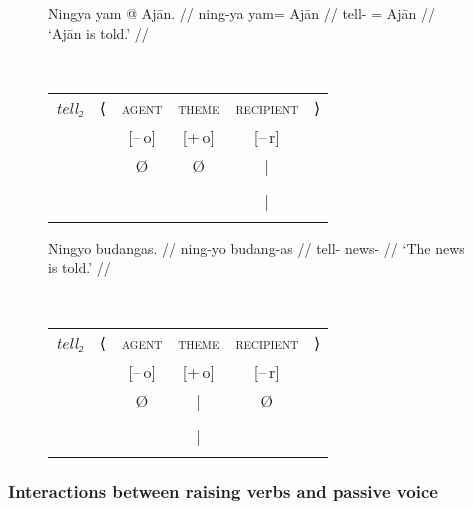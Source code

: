 \begin{figure}
\pex\label{ex:intrnzn_pass}
\a\label{ex:intrnzn_pass_1}%
\ljudge*\begin{minipage}[t]{.4\remaining}
\begingl
	\gla Ningya yam @ Ajān. //
	\glb ning-ya yam= Ajān //
	\glc tell-\TsgF{} \Dat{}= Ajān //
	\glft `Ajān is told.' //
\endgl
\end{minipage}
~
\begin{tabular}[t]{>{\itshape}l l c c c r}
tell₂
	& ⟨
	& \textsc{agent}
	& \textsc{theme}
	& \textsc{recipient}
	& ⟩
	\\
%
	& %
	& [–\,o]
	& [+\,o]
	& [–\,r]
	& %
	\\

%
	& %
	& Ø
	& Ø
	& |
	& %
	\\

%
	& %
	& %
	& %
	& \Subj
	& %
	\\

%
	& %
	& %
	& %
	& |
	& %
	\\

%
	& %
	& %
	& %
	& \fw{Ajān}
	& %
	\\
\end{tabular}

\a\label{ex:intrnzn_pass_2}%
\begin{minipage}[t]{.4\remaining}
\begingl
	\gla Ningyo budangas. //
	\glb ning-yo budang-as //
	\glc tell-\TsgN{} news-\Parg{} //
	\glft `The news is told.' //
\endgl
\end{minipage}
~
\begin{tabular}[t]{>{\itshape}l l c c c r}
tell₂
	& ⟨
	& \textsc{agent}
	& \textsc{theme}
	& \textsc{recipient}
	& ⟩
	\\
%
	& %
	& [–\,o]
	& [+\,o]
	& [–\,r]
	& %
	\\

%
	& %
	& Ø
	& |
	& Ø
	& %
	\\

%
	& %
	& %
	& \Subj
	& %
	& %
	\\

%
	& %
	& %
	& |
	& %
	& %
	\\

%
	& %
	& %
	& \fw{news}
	& %
	& %
	\\
\end{tabular}

\xe
\end{figure}

\subsubsection{Interactions between raising verbs and passive voice}

